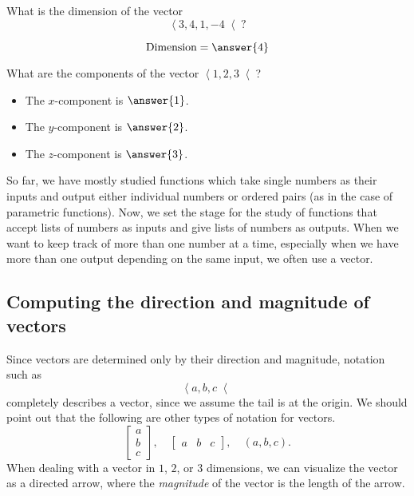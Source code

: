 \documentclass{ximera}
\begin{document}
\begin{question}
  What is the dimension of the vector 
  \[
  \left\langle 3,4,1,-4 \right\langle?
  \]
  \begin{prompt}
  \[
  \text{Dimension} = \answer{4}
  \]
  \end{prompt}
  \begin{question}
    What are the components of the vector $\left\langle 1,2,3 \right\langle$?
    \begin{prompt}
      \begin{itemize}
      \item The $x$-component is $\answer{1}$.
      \item The $y$-component is $\answer{2}$.
      \item The $z$-component is $\answer{3}$.
      \end{itemize}
    \end{prompt}
  \end{question}
\end{question}


So far, we have mostly studied functions which take single numbers as
their inputs and output either individual numbers or ordered pairs (as
in the case of parametric functions).  Now, we set the stage for the
study of functions that accept lists of numbers as inputs and give lists of
numbers as outputs. When we want to keep track of more than one number
at a time, especially when we have more than one output depending on the 
same input, we often use a vector.



\subsection{Computing the direction and magnitude of vectors}


Since vectors are determined only by their direction and magnitude,
notation such as
\[
\left\langle a,b,c \right\langle
\]
completely describes a vector, since we assume the tail is at the
origin. We should point out that the following are other types of notation for vectors.
\[
\begin{bmatrix}
  a\\
  b\\
  c
\end{bmatrix}, \quad
\begin{bmatrix}
  a & b & c
\end{bmatrix},
\quad
(a,b,c).
\]
When dealing with a vector in $1$, $2$, or $3$ dimensions, we can
visualize the vector as a directed arrow, where the \textit{magnitude} of the vector 
is the length of the arrow.
\end{document}
